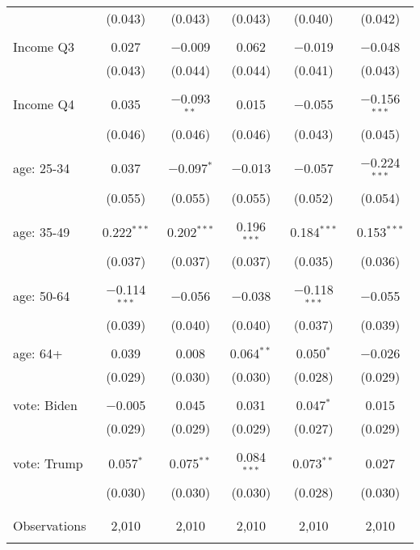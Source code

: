 \begin{tabular}{@{\extracolsep{5pt}}lccccc}
  & (0.043) & (0.043) & (0.043) & (0.040) & (0.042) \\ 
  & & & & & \\ 
 Income Q3 & 0.027 & $-$0.009 & 0.062 & $-$0.019 & $-$0.048 \\ 
  & (0.043) & (0.044) & (0.044) & (0.041) & (0.043) \\ 
  & & & & & \\ 
 Income Q4 & 0.035 & $-$0.093$^{**}$ & 0.015 & $-$0.055 & $-$0.156$^{***}$ \\ 
  & (0.046) & (0.046) & (0.046) & (0.043) & (0.045) \\ 
  & & & & & \\ 
 age: 25-34 & 0.037 & $-$0.097$^{*}$ & $-$0.013 & $-$0.057 & $-$0.224$^{***}$ \\ 
  & (0.055) & (0.055) & (0.055) & (0.052) & (0.054) \\ 
  & & & & & \\ 
 age: 35-49 & 0.222$^{***}$ & 0.202$^{***}$ & 0.196$^{***}$ & 0.184$^{***}$ & 0.153$^{***}$ \\ 
  & (0.037) & (0.037) & (0.037) & (0.035) & (0.036) \\ 
  & & & & & \\ 
 age: 50-64 & $-$0.114$^{***}$ & $-$0.056 & $-$0.038 & $-$0.118$^{***}$ & $-$0.055 \\ 
  & (0.039) & (0.040) & (0.040) & (0.037) & (0.039) \\ 
  & & & & & \\ 
 age: 64+ & 0.039 & 0.008 & 0.064$^{**}$ & 0.050$^{*}$ & $-$0.026 \\ 
  & (0.029) & (0.030) & (0.030) & (0.028) & (0.029) \\ 
  & & & & & \\ 
 vote: Biden & $-$0.005 & 0.045 & 0.031 & 0.047$^{*}$ & 0.015 \\ 
  & (0.029) & (0.029) & (0.029) & (0.027) & (0.029) \\ 
  & & & & & \\ 
 vote: Trump & 0.057$^{*}$ & 0.075$^{**}$ & 0.084$^{***}$ & 0.073$^{**}$ & 0.027 \\ 
  & (0.030) & (0.030) & (0.030) & (0.028) & (0.030) \\ 
  & & & & & \\ 
\hline \\[-1.8ex] 

Observations & 2,010 & 2,010 & 2,010 & 2,010 & 2,010 \\ 
\hline 
\hline \\[-1.8ex] 
\end{tabular} 